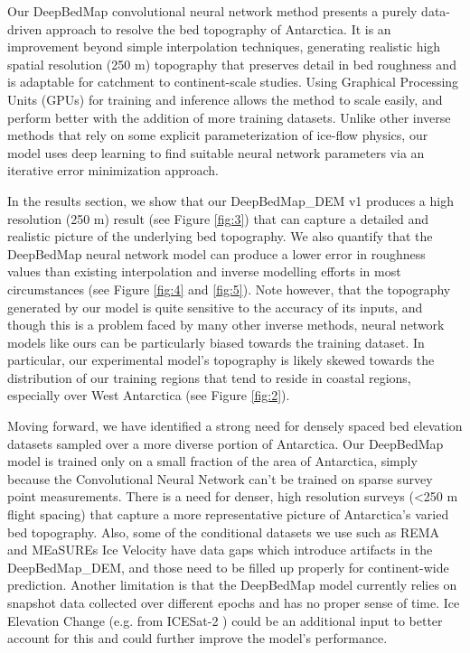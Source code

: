 \documentclass[tc, manuscript]{copernicus}
\begin{document}
Our DeepBedMap convolutional neural network method presents a purely data-driven approach to resolve the bed topography of Antarctica.
It is an improvement beyond simple interpolation techniques, generating realistic high spatial resolution (250 m) topography that preserves detail in bed roughness and is adaptable for catchment to continent-scale studies.
Using Graphical Processing Units (GPUs) for training and inference allows the method to scale easily, and perform better with the addition of more training datasets.
Unlike other inverse methods that rely on some explicit parameterization of ice-flow physics, our model uses deep learning to find suitable neural network parameters via an iterative error minimization approach.

In the results section, we show that our DeepBedMap\_DEM v1 produces a high resolution (250 m) result (see Figure \ref{fig:3}) that can capture a detailed and realistic picture of the underlying bed topography.
We also quantify that the DeepBedMap neural network model can produce a lower error in roughness values than existing interpolation and inverse modelling efforts in most circumstances (see Figure \ref{fig:4} and \ref{fig:5}).
Note however, that the topography generated by our model is quite sensitive to the accuracy of its inputs, and though this is a problem faced by many other inverse methods, neural network models like ours can be particularly biased towards the training dataset.
In particular, our experimental model's topography is likely skewed towards the distribution of our training regions that tend to reside in coastal regions, especially over West Antarctica (see Figure \ref{fig:2}).

Moving forward, we have identified a strong need for densely spaced bed elevation datasets sampled over a more diverse portion of Antarctica.
Our DeepBedMap model is trained only on a small fraction of the area of Antarctica, simply because the Convolutional Neural Network can't be trained on sparse survey point measurements.
There is a need for denser, high resolution surveys (<250 m flight spacing) that capture a more representative picture of Antarctica's varied bed topography.
Also, some of the conditional datasets we use such as REMA \citep{HowatReferenceElevationModel2019} and MEaSUREs Ice Velocity \citep{RignotMEaSUREsInSARBasedAntarctica2017} have data gaps which introduce artifacts in the DeepBedMap\_DEM, and those need to be filled up properly for continent-wide prediction.
Another limitation is that the DeepBedMap model currently relies on snapshot data collected over different epochs and has no proper sense of time.
Ice Elevation Change (e.g. from ICESat-2 \citep{MarkusIceCloudland2017}) could be an additional input to better account for this and could further improve the model's performance.
\end{document}
